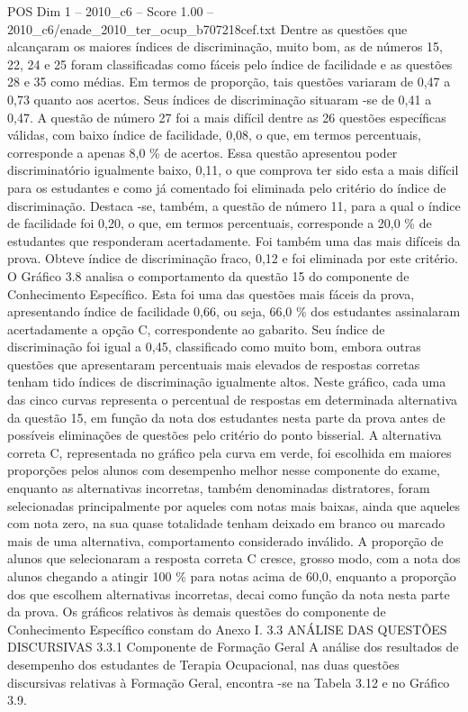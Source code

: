 \begin{textsample}{POS Dim 1 – 2010\_c6 – Score 1.00 – 2010\_c6/enade\_2010\_ter\_ocup\_b707218cef.txt}
Dentre as questões que alcançaram os maiores índices de discriminação, muito bom, as de números 15, 22, 24 e 25 foram classificadas como fáceis pelo índice de facilidade e as questões 28 e 35 como médias.
Em termos de proporção, tais questões variaram de 0,47 a 0,73 quanto aos acertos.
Seus índices de discriminação situaram -se de 0,41 a 0,47.
A questão de número 27 foi a mais difícil dentre as 26 questões específicas válidas, com baixo índice de facilidade, 0,08, o que, em termos percentuais, corresponde a apenas 8,0 \% de acertos.
Essa questão apresentou poder discriminatório igualmente baixo, 0,11, o que comprova ter sido esta a mais difícil para os estudantes e como já comentado foi eliminada pelo critério do índice de discriminação.
Destaca -se, também, a questão de número 11, para a qual o índice de facilidade foi 0,20, o que, em termos percentuais, corresponde a 20,0 \% de estudantes que responderam acertadamente.
Foi também uma das mais difíceis da prova.
Obteve índice de discriminação fraco, 0,12 e foi eliminada por este critério.
O Gráfico 3.8 analisa o comportamento da questão 15 do componente de Conhecimento Específico.
Esta foi uma das questões mais fáceis da prova, apresentando índice de facilidade 0,66, ou seja, 66,0 \% dos estudantes assinalaram acertadamente a opção C, correspondente ao gabarito.
Seu índice de discriminação foi igual a 0,45, classificado como muito bom, embora outras questões que apresentaram percentuais mais elevados de respostas corretas tenham tido índices de discriminação igualmente altos.
Neste gráfico, cada uma das cinco curvas representa o percentual de respostas em determinada alternativa da questão 15, em função da nota dos estudantes nesta parte da prova antes de possíveis eliminações de questões pelo critério do ponto bisserial.
A alternativa correta C, representada no gráfico pela curva em verde, foi escolhida em maiores proporções pelos alunos com desempenho melhor nesse componente do exame, enquanto as alternativas incorretas, também denominadas distratores, foram selecionadas principalmente por aqueles com notas mais baixas, ainda que aqueles com nota zero, na sua quase totalidade tenham deixado em branco ou marcado mais de uma alternativa, comportamento considerado inválido.
A proporção de alunos que selecionaram a resposta correta C cresce, grosso modo, com a nota dos alunos chegando a atingir 100 \% para notas acima de 60,0, enquanto a proporção dos que escolhem alternativas incorretas, decai como função da nota nesta parte da prova.
Os gráficos relativos às demais questões do componente de Conhecimento Específico constam do Anexo I. 3.3 ANÁLISE DAS QUESTÕES DISCURSIVAS 3.3.1 Componente de Formação Geral A análise dos resultados de desempenho dos estudantes de Terapia Ocupacional, nas duas questões discursivas relativas à Formação Geral, encontra -se na Tabela 3.12 e no Gráfico 3.9.

\end{textsample}
